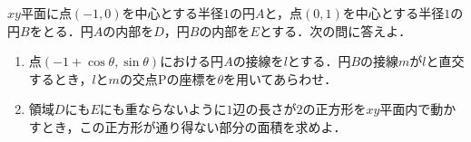 \documentclass[../../main.tex]{subfiles}
\begin{document}
$xy$平面に点$(-1,0)$を中心とする半径$1$の円$A$と，点$(0,1)$を中心とする半径$1$の円$B$をとる．円$A$の内部を$D$，円$B$の内部を$E$とする．次の問に答えよ．
\begin{enumerate}
  \item 点$(-1+\cos\theta,\sin\theta)$における円$A$の接線を$l$とする．円$B$の接線$m$が$l$と直交するとき，$l$と$m$の交点$\mathrm{P}$の座標を$\theta$を用いてあらわせ．
  \item 領域$D$にも$E$にも重ならないように$1$辺の長さが$2$の正方形を$xy$平面内で動かすとき，この正方形が通り得ない部分の面積を求めよ．
\end{enumerate}
\end{document}
